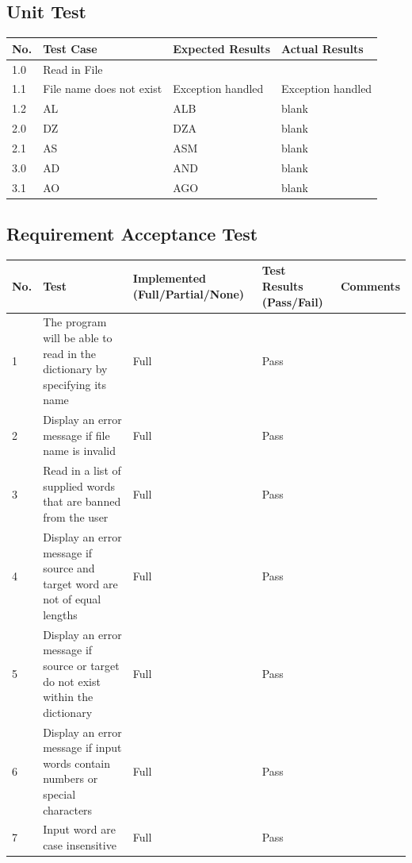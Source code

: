 \documentclass[12pt, a4]{report}
\begin{document}
	\subsection{Unit Test}


		\begin{tabular}{ |p{0.5cm}|p{5cm}|p{5cm}|p{5cm}| }
			\hline
			No. & Test Case & Expected Results & Actual Results \\
			\hline
			1.0 & Read in File & & \\
			1.1 & File name does not exist & Exception handled & Exception handled\\
			1.2 &AL & ALB & blank \\
			2.0    &DZ & DZA & blank \\
			2.1 & AS & ASM & blank\\
			3.0 & AD & AND   & blank \\
			3.1 & AO & AGO & blank\\
			\hline
		\end{tabular}
		
	\subsection{Requirement Acceptance Test}
	
		\begin{tabular}{ |p{0.5cm}|p{7.25cm}|p{2.5cm}|p{2.5cm}|p{2cm}| }
			\hline
			No. & Test & Implemented (Full/Partial/None) & Test Results (Pass/Fail) & Comments \\
			\hline
			1 & The program will be able to read in the dictionary by specifying its name & Full & Pass &  \\
			2 & Display an error message if file name is invalid & Full & Pass  & \\
			3 & Read in a list of supplied words that are banned from the user & Full & Pass & \\
			4 & Display an error message if source and target word are not of equal lengths & Full & Pass & \\
			5 & Display an error message if source or target do not exist within the dictionary & Full & Pass & \\
			6 & Display an error message if input words contain numbers or special characters & Full & Pass & \\
			7 & Input word are case insensitive & Full & Pass & \\
			\hline
		\end{tabular}
	
\end{document}
